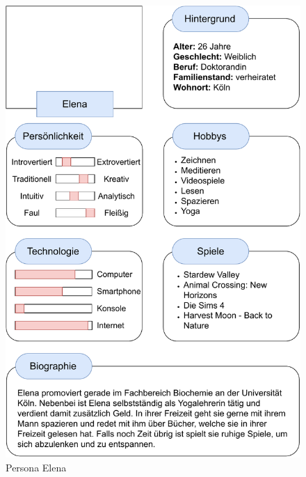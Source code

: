 \begin{figure}[H]
\centering
\includegraphics[width=0.83\columnwidth]{figures/Persona2.pdf}
  \caption{\label{fig:Persona2} Persona Elena}
\end{figure}
